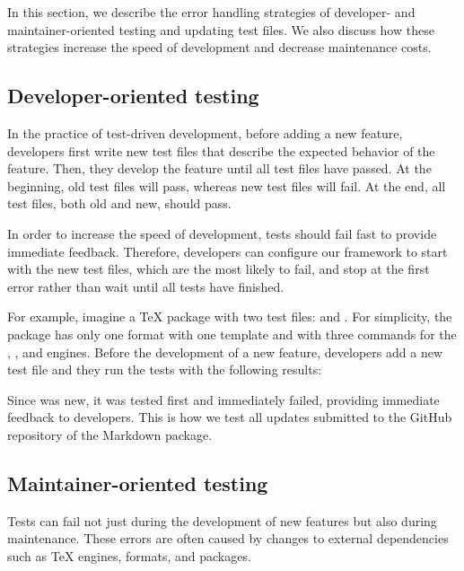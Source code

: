 \documentclass[final]{ltugboat}
\begin{document}
In this section, we describe the error handling strategies of developer- and maintainer-oriented testing and updating test files. We also discuss how these strategies increase the speed of development and decrease maintenance costs.

\subsection{Developer-oriented testing}

In the practice of test-driven development, before adding a new feature, developers first write new test files that describe the expected behavior of the feature. Then, they develop the feature until all test files have passed. At the beginning, old test files will pass, whereas new test files will fail. At the end, all test files, both old and new, should pass.

In order to increase the speed of development, tests should fail fast to provide immediate feedback. Therefore, developers can configure our framework to start with the new test files, which are the most likely to fail, and stop at the first error rather than wait until all tests have finished.

For example, imagine a \TeX{} package with two test files:  and . For simplicity, the package has only one format with one template and with three commands for the , , and  engines. Before the development of a new feature, developers add a new test file  and they run the tests with the following results:

\smallskip
\noindent
\begingroup
\centering

\par
\endgroup

\smallskip
\noindent
Since  was new, it was tested first and immediately failed, providing immediate feedback to developers. This is how we test all updates submitted to the GitHub repository of the Markdown package.

\subsection{Maintainer-oriented testing}

Tests can fail not just during the development of new features but also during maintenance. These errors are often caused by changes to external dependencies such as \TeX{} engines, formats, and packages.
\end{document}
